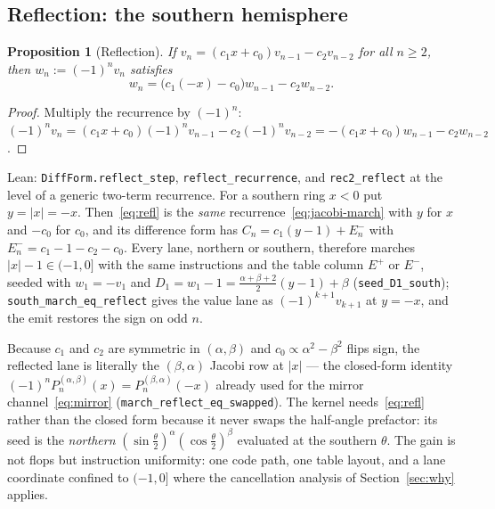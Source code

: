\documentclass[usenatbib,useAMS]{mnras}
\newtheorem{proposition}{Proposition}
\begin{document}
\subsection{Reflection: the southern hemisphere}
\label{sec:refl}

\begin{proposition}[Reflection]
\label{prop:refl}
If $v_n=(c_1x+c_0)v_{n-1}-c_2v_{n-2}$ for all $n\ge2$, then $w_n:=(-1)^nv_n$ satisfies
\begin{equation}
\label{eq:refl}
  w_n=\bigl(c_1(-x)-c_0\bigr)w_{n-1}-c_2w_{n-2}.
\end{equation}
\end{proposition}

\begin{proof}
Multiply the recurrence by $(-1)^n$: $(-1)^nv_n=(c_1x+c_0)(-1)^nv_{n-1}-c_2(-1)^nv_{n-2}=-(c_1x+c_0)w_{n-1}-c_2w_{n-2}$.
\end{proof}

Lean: \texttt{DiffForm.reflect\_step}, \texttt{reflect\_recurrence}, and \texttt{rec2\_reflect} at the level of a generic two-term recurrence. For a southern ring $x<0$ put $y=\lvert x\rvert=-x$. Then~\eqref{eq:refl} is the \emph{same} recurrence~\eqref{eq:jacobi-march} with $y$ for $x$ and $-c_0$ for $c_0$, and its difference form has $C_n=c_1(y-1)+E^-_n$ with $E^-_n=c_1-1-c_2-c_0$. Every lane, northern or southern, therefore marches $\lvert x\rvert-1\in(-1,0]$ with the same instructions and the table column $E^+$ or $E^-$, seeded with $w_1=-v_1$ and $D_1=w_1-1=\tfrac{\alpha+\beta+2}{2}(y-1)+\beta$ (\texttt{seed\_D1\_south}); \texttt{south\_march\_eq\_reflect} gives the value lane as $(-1)^{k+1}v_{k+1}$ at $y=-x$, and the emit restores the sign on odd $n$.

Because $c_1$ and $c_2$ are symmetric in $(\alpha,\beta)$ and $c_0\propto\alpha^2-\beta^2$ flips sign, the reflected lane is literally the $(\beta,\alpha)$ Jacobi row at $\lvert x\rvert$ --- the closed-form identity $(-1)^nP^{(\alpha,\beta)}_n(x)=P^{(\beta,\alpha)}_n(-x)$ already used for the mirror channel~\eqref{eq:mirror} (\texttt{march\_reflect\_eq\_swapped}). The kernel needs~\eqref{eq:refl} rather than the closed form because it never swaps the half-angle prefactor: its seed is the \emph{northern} $(\sin\tfrac\theta2)^\alpha(\cos\tfrac\theta2)^\beta$ evaluated at the southern $\theta$. The gain is not flops but instruction uniformity: one code path, one table layout, and a lane coordinate confined to $(-1,0]$ where the cancellation analysis of Section~\ref{sec:why} applies.
\end{document}
